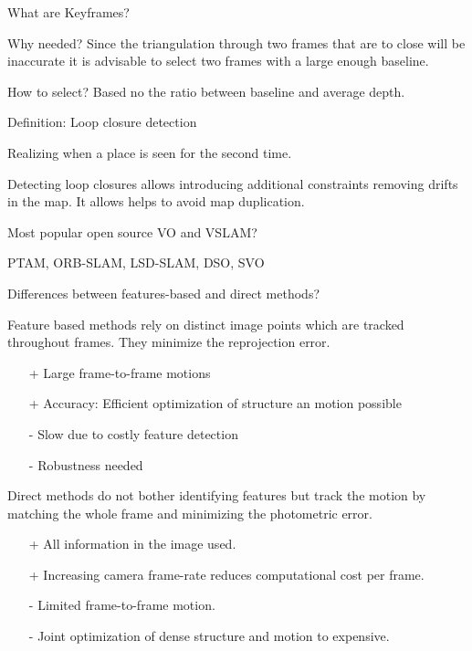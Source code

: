 \documentclass[10pt,a4paper]{scrartcl}
\begin{document}
\begin{multicols*}{2}
\begin{QandA}
{What are Keyframes?}
\item Why needed? Since the triangulation through two frames that are to close will be inaccurate it is advisable to select two frames with a large enough baseline.

\item How to select? Based no the ratio between baseline and average depth.
\end{QandA}

\begin{QandA}
{Definition: Loop closure detection}
\item Realizing when a place is seen for the second time.
\item Detecting loop closures allows introducing additional constraints removing drifts in the map. It allows helps to avoid map duplication.
\end{QandA}

\begin{QandA}
{Most popular open source VO and VSLAM?}
\item PTAM, ORB-SLAM, LSD-SLAM, DSO, SVO
\end{QandA}

\begin{QandA}
{Differences between features-based and direct methods?}
\item Feature based methods rely on distinct image points which are tracked throughout frames. They minimize the reprojection error. 
\begin{itemize}
\item[+] Large frame-to-frame motions
\item[+] Accuracy: Efficient optimization of structure an motion possible
\item[-] Slow due to costly feature detection
\item[-] Robustness needed
\end{itemize}
\item Direct methods do not bother identifying features but track the motion by matching the whole frame and minimizing the photometric error.
\begin{itemize}
\item[+] All information in the image used.
\item[+] Increasing camera frame-rate reduces computational cost per frame.
\item[-] Limited frame-to-frame motion.
\item[-] Joint optimization of dense structure and motion to expensive.
\end{itemize}
\end{QandA}


\end{multicols*}
\end{document}
